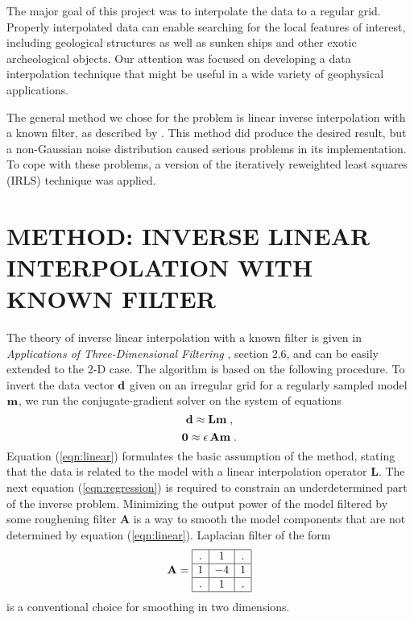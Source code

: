\par
The major goal of this project was to interpolate the data to a regular grid.
Properly interpolated data can enable searching for the 
local features of interest,
including geological structures as well as sunken ships and other exotic
archeological objects. Our attention was focused on 
developing a data interpolation
technique that might be useful in a wide variety of geophysical applications.
\par
The general method we chose for the problem is linear inverse interpolation
with a known filter, as described by .
This method did 
produce the desired result, but a non-Gaussian noise distribution caused
serious problems in its implementation. To cope with these problems,
a version of the iteratively reweighted least squares (IRLS) technique
\cite{SEG.1988.S7.1,Darche.sep.61.281}
was applied.

\section{METHOD: INVERSE LINEAR INTERPOLATION WITH KNOWN FILTER}

The theory of inverse linear interpolation with a known filter is
given in {\em Applications of Three-Dimensional Filtering}
\cite{Claerbout.tdf.82}, section 2.6, and can be easily extended to
the 2-D case. The algorithm is based on the following procedure. To invert 
the data vector ${\bf d}$ given on an irregular grid for a regularly sampled
model ${\bf m}$, 
we run the conjugate-gradient solver on the system of equations
\begin{equation} {\bf d \approx Lm\;, \label{eqn:linear} }\end{equation} 
\begin{equation} {\bf 0 \approx \epsilon \, Am\;. \label{eqn:regression}}
\end{equation}
Equation (\ref{eqn:linear}) formulates the basic assumption of the method,
stating that the data 
is related to 
the model with a linear interpolation operator $\mathbf{L}$. The next equation
(\ref{eqn:regression}) is required to
constrain an underdetermined part of the inverse problem. Minimizing the
output power 
of the model 
filtered by some roughening filter $\mathbf{A}$ is a way to smooth the
model components that are not determined by equation (\ref{eqn:linear}). 
Laplacian filter of 
the form
\begin{equation} 
{\bf A}=
\begin{array}{|c|c|c|}
\hline
. & 1 & . \\
\hline
1 & -4 & 1 \\
\hline
. & 1 & . \\
\hline
\end{array}
\label{eqn:laplacian}
\end{equation}
is a conventional choice for smoothing in two dimensions.

